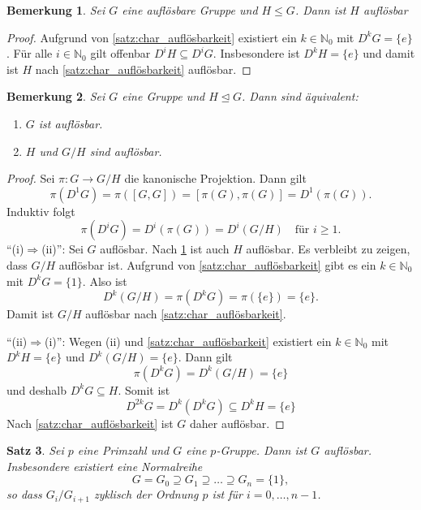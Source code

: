\documentclass[a4paper, twoside, 11pt, ngerman]{report}
\newcommand{\NN}{\mathds N}
\theoremstyle{definistyle}
\newtheorem{satz}{Satz}[section]
\newtheorem{bem}[satz]{Bemerkung}
\theoremstyle{remark}
\begin{document}
\begin{bem}\label{bem:auflösbar_untergr}
Sei $G$ eine auflösbare Gruppe und $H\leq G$. Dann ist $H$ auflösbar    
\end{bem}
\begin{proof}
Aufgrund von \ref{satz:char_auflösbarkeit} existiert ein $k\in\NN_0$ mit $D^kG=\{e\}$. Für alle $i\in\NN_0$ 
gilt offenbar $D^iH\subseteq D^iG$. Insbesondere ist $D^kH=\{e\}$ und damit ist $H$ nach \ref{satz:char_auflösbarkeit}
auflösbar.
\end{proof}

\begin{bem}\label{bem:aufloesbarkeit_lift}
Sei $G$ eine Gruppe und $H \trianglelefteq G$. Dann sind äquivalent:
\begin{enumerate}[label=(\roman*)]
    \item $G$ ist auflösbar.
    \item $H$ und $G / H$ sind auflösbar.
\end{enumerate}
\end{bem}

\begin{proof}
Sei $\pi \colon G \to G / H$ die kanonische Projektion. Dann gilt
\[
\pi(D^1 G) = \pi([G, G]) = [\pi(G), \pi(G)] = D^1(\pi(G)).
\]
Induktiv folgt
\[
\pi(D^i G) = D^i(\pi(G)) = D^i(G / H) \quad \text{für } i \geq 1.
\]
"`(i)$\Rightarrow$(ii)"': Sei $G$ auflösbar. Nach \ref{bem:auflösbar_untergr} ist auch $H$ auflösbar.
Es verbleibt zu zeigen, dass $G/H$ auflösbar ist. Aufgrund von \ref{satz:char_auflösbarkeit} gibt es ein $k \in \NN_0$ mit $D^k G = \{1\}$. Also ist
\[
D^k(G / H) = \pi(D^k G) = \pi(\{e\}) = \{e\}.
\]
Damit ist $G / H$ auflösbar nach \ref{satz:char_auflösbarkeit}.

"`(ii)$\Rightarrow$(i)"': Wegen (ii) und \ref{satz:char_auflösbarkeit} existiert ein $k \in \NN_0$ mit $D^k H = \{e\}$ und $D^k(G / H) = \{e\}$. Dann gilt
\[
\pi(D^{k} G) = D^k(G / H) = \{e\}
\]
und deshalb $D^{k} G \subseteq H$. Somit ist
\[
D^{2k} G = D^k(D^k G) \subseteq D^k H = \{e\}
\]
Nach \ref{satz:char_auflösbarkeit} ist $G$ daher auflösbar.
\end{proof}

\begin{satz}\label{satz:p_gruppen_aufloesbar}
Sei $p$ eine Primzahl und $G$ eine $p$-Gruppe. 
Dann ist $G$ auflösbar. Insbesondere existiert eine Normalreihe
\[
G = G_0 \supseteq G_1 \supseteq \dots \supseteq G_n = \{1\},
\]
so dass $G_i / G_{i+1}$ zyklisch der Ordnung $p$ ist für $i = 0, \dots, n-1$.
\end{satz}
\end{document}
